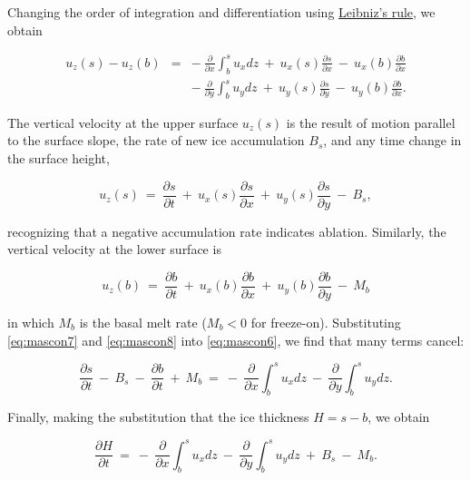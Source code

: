 \noindent
Changing the order of integration and differentiation using 
\href{http://en.wikipedia.org/wiki/Leibniz_integral_rule}{Leibniz's rule}, we obtain

\begin{equation}
\begin{matrix}
u_{z} \left(s\right)-u_{z} \left(b\right) & = & -~\frac{\partial}{\partial x} \int_{b}^{s} u_{x} dz ~ +~u_{x}(s)\frac{\partial s}{\partial x} ~-~ u_{x}(b)\frac{\partial b}{\partial x}  \\ 
& & -~\frac{\partial}{\partial y}\int_{b}^{s} u_{y} dz   ~ +~u_{y}(s)\frac{\partial s}{\partial y} ~-~ u_{y}(b)\frac{\partial b}{\partial x}.
\end{matrix}
\label{eq:mascon6}
\end{equation}

The vertical velocity at the upper surface $u_{z}(s)$ is the result of motion parallel to the surface slope, 
the rate of new ice accumulation $B_s$, and any time change in the surface height,

\begin{equation}
u_{z} \left(s\right)~=~\frac{\partial s}{\partial t}~+~u_{x}(s)\frac{\partial s}{\partial x}~+~u_{y}(s)\frac{\partial s}{\partial y}~-~B_s, 
\label{eq:mascon7}
\end{equation}

\noindent
recognizing that a negative accumulation rate indicates ablation. Similarly, the vertical velocity at the lower surface is

\begin{equation}
u_{z} \left(b\right)~=~\frac{\partial b}{\partial t}~+~u_{x}(b)\frac{\partial b}{\partial x}~+~u_{y}(b)\frac{\partial b}{\partial y}~-~M_b
\label{eq:mascon8}
\end{equation}

\noindent
in which $M_b$ is the basal melt rate ($M_b < 0$ for freeze-on).
Substituting \eqref{eq:mascon7} and \eqref{eq:mascon8} into \eqref{eq:mascon6}, we find that many terms cancel:

\begin{equation}
\frac{\partial s}{\partial t}~-~B_s~-~\frac{\partial b}{\partial t}~+~M_b~=~-~\frac{\partial}{\partial x} \int_{b}^{s} u_{x} dz~-~\frac{\partial}{\partial y} \int_{b}^{s} u_{y} dz.
\label{eq:mascon9}
\end{equation}

\noindent
Finally, making the substitution that the ice thickness $H=s-b$, we obtain

\begin{equation}
\frac{\partial H}{\partial t}~=~-~\frac{\partial}{\partial x} \int_{b}^{s} u_{x} dz~-~\frac{\partial}{\partial y} \int_{b}^{s} u_{y} dz ~+~B_s~-~M_b.
\label{eq:mascon10}
\end{equation}

